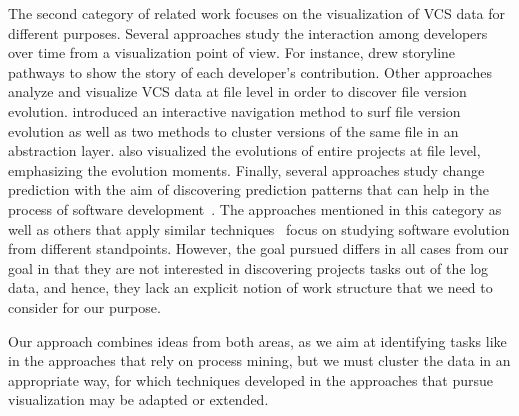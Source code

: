 The second category of related work focuses on the visualization of VCS data %
for different purposes.
Several approaches study the interaction among developers over time from a visualization point of view. For instance,  \cite{ogawa2010software} drew storyline pathways to show the story of each developer's contribution. Other approaches analyze and visualize VCS data at file level in order to discover file version evolution. \cite{voinea_multiscale_2006} introduced an interactive navigation method to surf file version evolution as well as two methods to cluster versions of the same file in an abstraction layer. \cite{jingwei_evolution_2004} also visualized the evolutions of entire projects at file level, emphasizing the evolution moments.
Finally, several approaches study change prediction with the aim of discovering prediction patterns that can help in the process of software development~\citep{DBLP:journals/tse/ZimmermannWDZ05,ying_predicting_2004}.
The approaches mentioned in this category as well as others that apply similar techniques~\citep{feldt2013supporting,kagdi_mining_2006,dambros_flexible_2008} focus on studying software evolution from different standpoints. However, the goal pursued differs in all cases from our goal in that they are not interested in discovering projects tasks out of the log data, and hence, they lack an explicit notion of work structure that we need to consider for our purpose.

Our approach combines ideas from both areas, as we aim at identifying tasks like in the approaches that rely on process mining, but we must cluster the data in an appropriate way, for which techniques developed in the approaches that pursue visualization may be adapted or extended.

%
